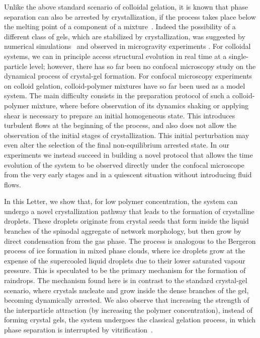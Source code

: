 \documentclass[preprint,amsmath,amssymb,superscriptaddress]{revtex4}
\begin{document}
Unlike the above standard scenario of colloidal gelation, it is known that phase separation can also be arrested by crystallization, if the process takes place below the melting point of a component of a mixture~\cite{tanaka1985new}. Indeed the possibility of a different class of gels, which are stabilized by crystallization, 
was suggested by numerical simulations~\cite{soga1999metastable,fortini2008crystallization,perez2011pathways} and observed in microgravity experiments \cite{sabin2012}. 
For colloidal systems, we can in principle access structural evolution in real time at a single-particle level; however, there has so far been no confocal microscopy  
study on the dynamical process of crystal-gel formation. 
For confocal microscopy experiments on colloid gelation, colloid-polymer mixtures have so far been used as a model system. 
The main difficulty consists in the preparation protocol of such a colloid-polymer mixture, where before observation of its dynamics shaking or applying shear is necessary to prepare an initial homogeneous state. This introduces turbulent flows at the beginning of the process, and also does not allow the
observation of the initial stages of crystallization. This initial perturbation may even alter the selection of the final non-equilibrium arrested state.  
In our experiments we instead succeed in building a novel protocol that allows the time evolution of the system to be observed directly
under the confocal microscope from the very early stages and in a quiescent situation without introducing fluid flows. 

In this Letter, we show that, for low polymer concentration, the system can undergo a novel crystallization pathway that leads to the formation
of crystalline droplets. These droplets originate from crystal seeds that form inside the liquid branches of the spinodal aggregate of network morphology, but then grow by direct condensation from the gas phase. The process is analogous to the Bergeron process of ice formation in mixed phase clouds, where ice droplets grow at the
expense of the supercooled liquid droplets due to their lower saturated vapour pressure. 
This is speculated to be the primary mechanism for the formation of raindrops. 
The mechanism found here is in contrast to the standard crystal-gel scenario, where crystals nucleate and grow inside the dense branches of the gel, becoming dynamically arrested. We also observe that increasing the strength of the interparticle attraction
(by increasing the polymer concentration), instead of forming crystal gels, the system undergoes the classical gelation process, in which
phase separation is interrupted by vitrification~\cite{verhaegh1997transient,tanaka1999colloid,Royall2007,lu2008gelation}. 
\end{document}
